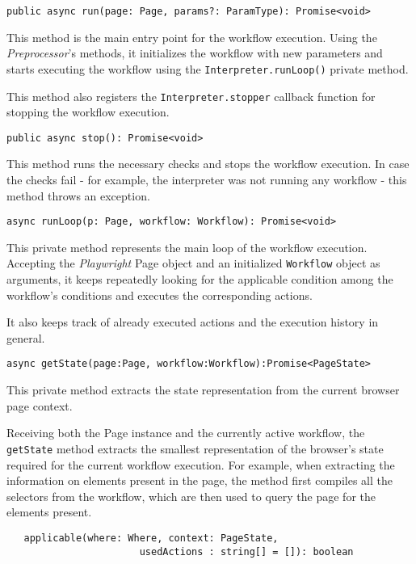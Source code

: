 \smallskip

\emptyline
\verb|public async run(page: Page, params?: ParamType): Promise<void>|

\smallskip

This method is the main entry point for the workflow execution.
Using the \textit{Preprocessor}'s methods, it initializes the workflow with new parameters and starts executing the workflow using the \texttt{Interpreter.runLoop()} private method.

This method also registers the \texttt{Interpreter.stopper} callback function for stopping the workflow execution.

\emptyline
\verb|public async stop(): Promise<void>|

\smallskip

This method runs the necessary checks and stops the workflow execution.
In case the checks fail - for example, the interpreter was not running any workflow - this method throws an exception. 

\emptyline
\verb|async runLoop(p: Page, workflow: Workflow): Promise<void>|

\smallskip

This private method represents the main loop of the workflow execution.
Accepting the \textit{Playwright} Page object and an initialized \texttt{Workflow} object as arguments,
it keeps repeatedly looking for the applicable condition among the workflow's conditions and executes the corresponding actions.

It also keeps track of already executed actions and the execution history in general.

\emptyline
\verb|async getState(page:Page, workflow:Workflow):Promise<PageState>|

\smallskip

This private method extracts the state representation from the current browser page context.

Receiving both the Page instance and the currently active workflow, the \texttt{getState} method extracts the smallest representation of the browser's state required 
for the current workflow execution. For example, when extracting the information on elements present in the page, the method first compiles all the selectors from the workflow,
which are then used to query the page for the elements present.

\emptyline
\begin{verbatim}   applicable(where: Where, context: PageState, 
                       usedActions : string[] = []): boolean \end{verbatim}


